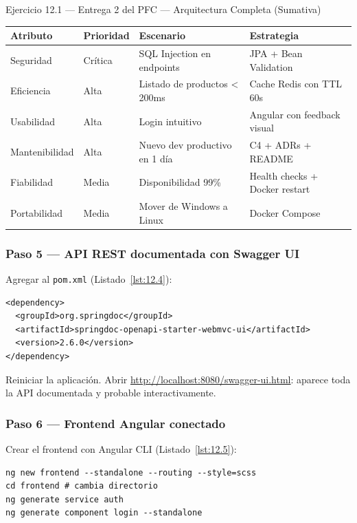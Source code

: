 \begin{cajaejercicio}{Ejercicio 12.1 --- Entrega 2 del PFC --- Arquitectura Completa (Sumativa)}
\begin{tabularx}{\textwidth}{llXX}
\toprule
\textbf{Atributo} & \textbf{Prioridad} & \textbf{Escenario} & \textbf{Estrategia}\\
\midrule
Seguridad & Crítica & SQL Injection en endpoints & JPA + Bean Validation\\
Eficiencia & Alta & Listado de productos < 200ms & Cache Redis con TTL 60s\\
Usabilidad & Alta & Login intuitivo & Angular con feedback visual\\
Mantenibilidad & Alta & Nuevo dev productivo en 1 día & C4 + ADRs + README\\
Fiabilidad & Media & Disponibilidad 99\% & Health checks + Docker restart\\
Portabilidad & Media & Mover de Windows a Linux & Docker Compose\\
\bottomrule
\end{tabularx}

\subsubsection*{Paso 5 --- API REST documentada con Swagger UI}

Agregar al \texttt{pom.xml} (Listado~\ref{lst:12.4}):

\begin{lstlisting}[style=xml,numbers=none,caption={Ejemplo de XML},label=lst:12.4]
<dependency>
  <groupId>org.springdoc</groupId>
  <artifactId>springdoc-openapi-starter-webmvc-ui</artifactId>
  <version>2.6.0</version>
</dependency>
\end{lstlisting}

Reiniciar la aplicación. Abrir
\url{http://localhost:8080/swagger-ui.html}: aparece toda la API
documentada y probable interactivamente.

\subsubsection*{Paso 6 --- Frontend Angular conectado}

Crear el frontend con Angular CLI (Listado~\ref{lst:12.5}):
\begin{lstlisting}[style=shell,numbers=none,caption={Ejemplo de Shell},label=lst:12.5]
ng new frontend --standalone --routing --style=scss
cd frontend # cambia directorio
ng generate service auth
ng generate component login --standalone
\end{lstlisting}


\end{cajaejercicio}
